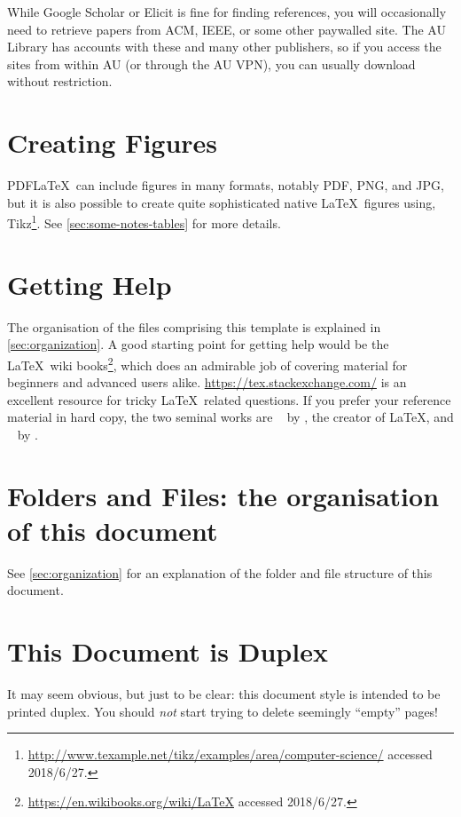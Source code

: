 While Google Scholar or Elicit is fine for finding references, you will occasionally need to retrieve papers from ACM, IEEE, or some other paywalled site.
The AU Library has accounts with these and many other publishers, so if you access the sites from within AU (or through the AU VPN), you can usually download without restriction.

\section*{Creating Figures}
\label{sec:creating-figures}

PDF\LaTeX\ can include figures in many formats, notably \acs{PDF}, \acs{PNG}, and \acs{JPG}, but it is also possible to create quite sophisticated native \LaTeX\ figures using, \eg Tikz\footnote{\url{http://www.texample.net/tikz/examples/area/computer-science/} accessed 2018/6/27.}. See \autoref{sec:some-notes-tables} for more details.

\section*{Getting Help}
\label{sec:getting-help}
The organisation of the files comprising this template is explained in \autoref{sec:organization}.
A good starting point for getting help would be the \LaTeX\ wiki books\footnote{\url{https://en.wikibooks.org/wiki/LaTeX} accessed 2018/6/27.}, which does an admirable job of covering material for beginners and advanced users
alike.
\url{https://tex.stackexchange.com/} is an excellent resource for tricky \LaTeX\ related questions.
If you prefer your reference material in hard copy, the two seminal works are ~\cite{Lamport1994:LADPSUGARM1994} by \citeauthor{Lamport1994:LADPSUGARM1994}, the creator of \LaTeX,
and ~\cite{Mittelbach2004:TLC2004} by \citeauthor{Mittelbach2004:TLC2004}.

\section*{Folders and Files: the organisation of this document}
\label{sec:fold-files:-organ}
See \autoref{sec:organization} for an explanation of the folder and file structure of this document.


\section*{This Document is Duplex}
\label{sec:print-this-docum}

It may seem obvious, but just to be clear: this document style is intended to be printed duplex. You should \emph{not} start trying to delete seemingly ``empty'' pages!


